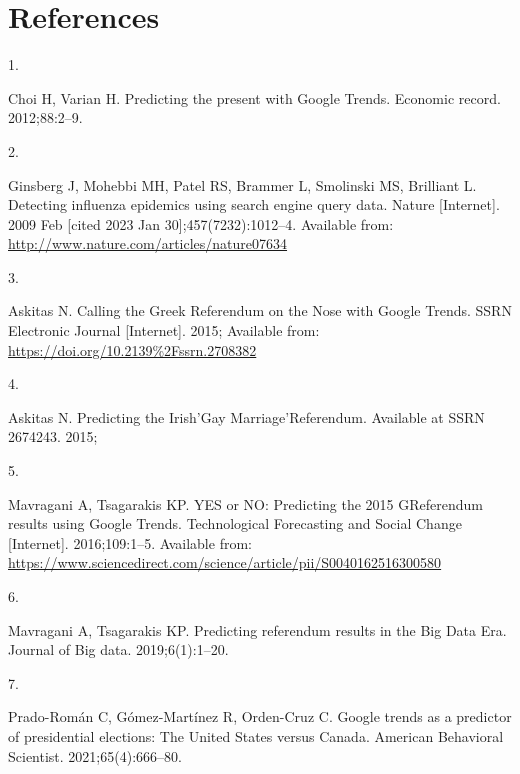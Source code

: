 \documentclass[
  letterpaper,
  DIV=11,
  numbers=noendperiod]{scrartcl}
\newlength{\cslhangindent}
\newlength{\csllabelwidth}
\newlength{\cslentryspacingunit} %
\newenvironment{CSLReferences}[2] %
 {%
  \setlength{\parindent}{0pt}
  \ifodd #1
  \let\oldpar\par
  \def\par{\hangindent=\cslhangindent\oldpar}
  \fi
  \setlength{\parskip}{#2\cslentryspacingunit}
 }%
 {}
\newcommand{\CSLLeftMargin}[1]{\parbox[t]{\csllabelwidth}{#1}}
\newcommand{\CSLRightInline}[1]{\parbox[t]{\linewidth - \csllabelwidth}{#1}\break}
\begin{document}
\newpage

\hypertarget{references}{%
\section{References}\label{references}}

\hypertarget{refs}{}
\begin{CSLReferences}{0}{0}
\leavevmode{}%
\CSLLeftMargin{1. }%
\CSLRightInline{Choi H, Varian H. Predicting the present with {Google}
{Trends}. Economic record. 2012;88:2--9. }

\leavevmode{}%
\CSLLeftMargin{2. }%
\CSLRightInline{Ginsberg J, Mohebbi MH, Patel RS, Brammer L, Smolinski
MS, Brilliant L. Detecting influenza epidemics using search engine query
data. Nature {[}Internet{]}. 2009 Feb {[}cited 2023 Jan
30{]};457(7232):1012--4. Available from:
\url{http://www.nature.com/articles/nature07634}}

\leavevmode{}%
\CSLLeftMargin{3. }%
\CSLRightInline{Askitas N. Calling the {Greek} {Referendum} on the
{Nose} with {Google} {Trends}. SSRN Electronic Journal {[}Internet{]}.
2015; Available from: \url{https://doi.org/10.2139\%2Fssrn.2708382}}

\leavevmode{}%
\CSLLeftMargin{4. }%
\CSLRightInline{Askitas N. Predicting the {Irish}'{Gay}
{Marriage}'{Referendum}. Available at SSRN 2674243. 2015; }

\leavevmode{}%
\CSLLeftMargin{5. }%
\CSLRightInline{Mavragani A, Tsagarakis KP. {YES} or {NO}: {Predicting}
the 2015 {GReferendum} results using {Google} {Trends}. Technological
Forecasting and Social Change {[}Internet{]}. 2016;109:1--5. Available
from:
\url{https://www.sciencedirect.com/science/article/pii/S0040162516300580}}

\leavevmode{}%
\CSLLeftMargin{6. }%
\CSLRightInline{Mavragani A, Tsagarakis KP. Predicting referendum
results in the {Big} {Data} {Era}. Journal of Big data. 2019;6(1):1--20.
}

\leavevmode{}%
\CSLLeftMargin{7. }%
\CSLRightInline{Prado-Román C, Gómez-Martínez R, Orden-Cruz C. Google
trends as a predictor of presidential elections: The {United} {States}
versus {Canada}. American Behavioral Scientist. 2021;65(4):666--80. }


\end{CSLReferences}
\end{document}
